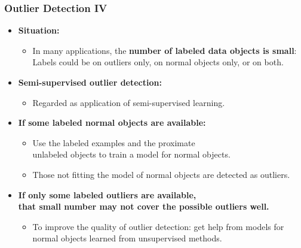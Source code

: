 \begin{frame}
  \frametitle{Outlier Detection IV}
  \begin{itemize}
  \item \textbf{Situation:}
    \begin{itemize}
    \item In many applications, the \textbf{\color{airforceblue}number of labeled data objects is small}:\\
      Labels could be on outliers only, on normal objects only, or on both.
    \end{itemize}
  \item \textbf{Semi-supervised outlier detection:}
    \begin{itemize}
    \item Regarded as application of semi-supervised learning.
    \end{itemize}
  \item \textbf{If some {\color{airforceblue}labeled normal objects} are available:}
    \begin{itemize}
    \item Use the labeled examples and the proximate \\
      unlabeled objects to train a model for normal objects.
    \item Those not fitting the model of normal objects are detected as outliers.
    \end{itemize}
  \item \textbf{If only some {\color{airforceblue}labeled outliers} are available, \\ that small number may not cover the possible outliers well.}
    \begin{itemize}
    \item To improve the quality of outlier detection: get help from models for normal objects learned from unsupervised methods.
    \end{itemize}
  \end{itemize}
\end{frame}


